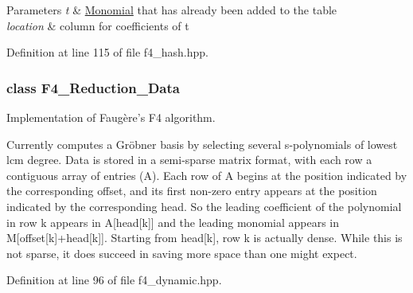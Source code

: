 \begin{DoxyParams}{Parameters}
{\em t} & {\ttfamily \hyperlink{group__polygroup_class_monomial}{Monomial}} that has already been added to the table \\
\hline
{\em location} & column for coefficients of {\ttfamily t} \\
\hline
\end{DoxyParams}


Definition at line 115 of file f4\+\_\+hash.\+hpp.

\label{class_f4___reduction___data}
\subsubsection{class F4\+\_\+\+Reduction\+\_\+\+Data}
Implementation of Faug\`{e}re's F4 algorithm. 

Currently computes a Gr\"{o}bner basis by selecting several s-\/polynomials of lowest lcm degree. Data is stored in a semi-\/sparse matrix format, with each row a contiguous array of entries ({\ttfamily A}). Each row of {\ttfamily A} begins at the position indicated by the corresponding {\ttfamily offset}, and its first non-\/zero entry appears at the position indicated by the corresponding {\ttfamily head}. So the leading coefficient of the polynomial in row {\ttfamily k} appears in {\ttfamily A\mbox{[}head\mbox{[}k\mbox{]}\mbox{]}} and the leading monomial appears in {\ttfamily M\mbox{[}offset\mbox{[}k\mbox{]}+head\mbox{[}k\mbox{]}\mbox{]}}. Starting from {\ttfamily head\mbox{[}k\mbox{]}}, row {\ttfamily k} is actually dense. While this is not sparse, it does succeed in saving more space than one might expect. 

Definition at line 96 of file f4\+\_\+dynamic.\+hpp.

